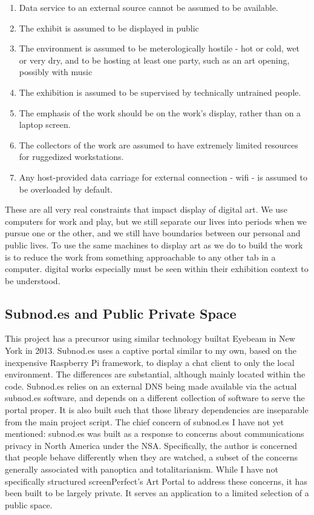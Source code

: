 \begin{enumerate}
\item Data service to an external source cannot be assumed to be available. 
\item The exhibit is assumed to be displayed in public
\item The environment is assumed to be meterologically hostile - hot or cold, wet or very dry, and to be hosting at least one party, such as an art opening, possibly with music
\item The exhibition is assumed to be supervised by technically untrained people.
\item The emphasis of the work should be on the work's display, rather than on a laptop screen.
\item The collectors of the work are assumed to have extremely limited resources for ruggedized workstations.
\item Any host-provided data carriage for external connection - wifi - is assumed to be overloaded by default.
\end{enumerate}

 These are all very real constraints that impact display of digital art. We use computers for work and play, but we still separate our lives into periods when we pursue one or the other, and we still have boundaries between our personal and public lives. To use the same machines to display art as we do to build the work is to reduce the work from something approachable to any other tab in a computer. digital works especially must be seen within their exhibition context to be understood.

\subsection{Subnod.es and Public Private Space}
This project has a precursor using similar technology builtat Eyebeam in New York in 2013. Subnod.es uses a captive portal similar to my own, based on the inexpensive Raspberry Pi framework, to display a chat client to only the local environment. The differences are substantial, although mainly located within the code. Subnod.es relies on an external DNS being made available via the actual subnod.es software, and depends on a different collection of software to serve the portal proper. It is also built such that those library dependencies are inseparable from the main project script.
The chief concern of subnod.es I have not yet mentioned: subnod.es was built as a response to concerns about communications privacy in North America under the NSA. Specifically, the author is concerned that people behave differently when they are watched, a subset of the concerns generally associated with panoptica and totalitarianism. While I have not specifically structured screenPerfect's Art Portal to address these concerns, it has been built to be largely private. It serves an application to a limited selection of a public space.

